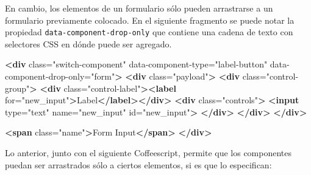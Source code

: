 \documentclass[12pt,titlepage,]{article}
\newenvironment{Shaded}{}{}
\newcommand{\KeywordTok}[1]{\textcolor[rgb]{0.00,0.44,0.13}{\textbf{{#1}}}}
\newcommand{\CharTok}[1]{\textcolor[rgb]{0.25,0.44,0.63}{{#1}}}
\newcommand{\StringTok}[1]{\textcolor[rgb]{0.25,0.44,0.63}{{#1}}}
\newcommand{\CommentTok}[1]{\textcolor[rgb]{0.38,0.63,0.69}{\textit{{#1}}}}
\newcommand{\OtherTok}[1]{\textcolor[rgb]{0.00,0.44,0.13}{{#1}}}
\newcommand{\FunctionTok}[1]{\textcolor[rgb]{0.02,0.16,0.49}{{#1}}}
\newcommand{\NormalTok}[1]{{#1}}
\begin{document}
En cambio, los elementos de un formulario sólo pueden arrastrarse a un
formulario previamente colocado. En el siguiente fragmento se puede
notar la propiedad \texttt{data-component-drop-only} que contiene una
cadena de texto con selectores CSS en dónde puede ser agregado.

\begin{Shaded}
\begin{Highlighting}[]
\KeywordTok{<div}\OtherTok{ class=}\StringTok{"switch-component"}\OtherTok{ data-component-type=}\StringTok{"label-button"} 
\OtherTok{     data-component-drop-only=}\StringTok{"form"}\KeywordTok{>}
  \KeywordTok{<div}\OtherTok{ class=}\StringTok{"payload"}\KeywordTok{>}
    \KeywordTok{<div}\OtherTok{ class=}\StringTok{"control-group"}\KeywordTok{>}
      \KeywordTok{<div}\OtherTok{ class=}\StringTok{"control-label"}\KeywordTok{><label}\OtherTok{ for=}\StringTok{"new_input"}\KeywordTok{>}\NormalTok{Label}\KeywordTok{</label></div>}
      \KeywordTok{<div}\OtherTok{ class=}\StringTok{"controls"}\KeywordTok{>}
        \KeywordTok{<input}\OtherTok{ type=}\StringTok{"text"}\OtherTok{ name=}\StringTok{"new_input"}\OtherTok{ id=}\StringTok{"new_input"}\KeywordTok{>}
      \KeywordTok{</div>}
    \KeywordTok{</div>}
  \KeywordTok{</div>}

  \KeywordTok{<span}\OtherTok{ class=}\StringTok{"name"}\KeywordTok{>}\NormalTok{Form Input}\KeywordTok{</span>}
\KeywordTok{</div>}
\end{Highlighting}
\end{Shaded}

Lo anterior, junto con el siguiente Coffeescript, permite que los
componentes puedan ser arrastrados sólo a ciertos elementos, si es que
lo especifican:

\begin{Shaded}
\end{Shaded}
\end{document}
